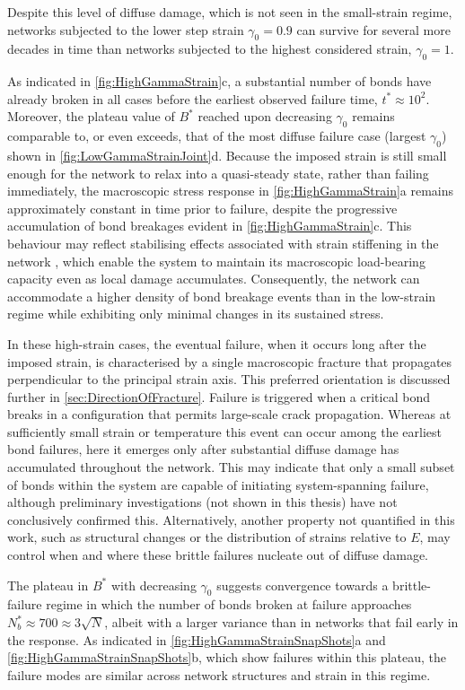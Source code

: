 Despite this level of diffuse damage, which is not seen in the small-strain regime, networks subjected to the lower step strain $\gamma_0=0.9$ can survive for several more decades in time than networks subjected to the highest considered strain, $\gamma_0=1$.

As indicated in \cref{fig:HighGammaStrain}c, a substantial number of bonds have already broken in all cases before the earliest observed failure time, $t^*\approx10^{2}$. Moreover, the plateau value of $B^*$ reached upon decreasing $\gamma_0$ remains comparable to, or even exceeds, that of the most diffuse failure case (largest $\gamma_0$) shown in \cref{fig:LowGammaStrainJoint}d. Because the imposed strain is still small enough for the network to relax into a quasi-steady state, rather than failing immediately, the macroscopic stress response in \cref{fig:HighGammaStrain}a remains approximately constant in time prior to failure, despite the progressive accumulation of bond breakages evident in \cref{fig:HighGammaStrain}c. This behaviour may reflect stabilising effects associated with strain stiffening in the network \cite{sharma_strain-controlled_2016}, which enable the system to maintain its macroscopic load-bearing capacity even as local damage accumulates. Consequently, the network can accommodate a higher density of bond breakage events than in the low-strain regime while exhibiting only minimal changes in its sustained stress.

In these high-strain cases, the eventual failure, when it occurs long after the imposed strain, is characterised by a single macroscopic fracture that propagates perpendicular to the principal strain axis. This preferred orientation is discussed further in \cref{sec:DirectionOfFracture}. Failure is triggered when a critical bond breaks in a configuration that permits large-scale crack propagation. Whereas at sufficiently small strain or temperature this event can occur among the earliest bond failures, here it emerges only after substantial diffuse damage has accumulated throughout the network. This may indicate that only a small subset of bonds within the system are capable of initiating system-spanning failure, although preliminary investigations (not shown in this thesis) have not conclusively confirmed this. Alternatively, another property not quantified in this work, such as structural changes or the distribution of strains relative to $E$, may control when and where these brittle failures nucleate out of diffuse damage.

The plateau in $B^*$ with decreasing $\gamma_0$ suggests convergence towards a brittle-failure regime in which the number of bonds broken at failure approaches $N_b^*\approx 700 \approx 3 \sqrt{N}$, albeit with a larger variance than in networks that fail early in the response. As indicated in \cref{fig:HighGammaStrainSnapShots}a and \cref{fig:HighGammaStrainSnapShots}b, which show failures within this plateau, the failure modes are similar across network structures and strain in this regime. 

